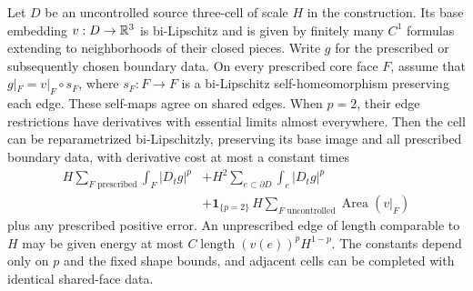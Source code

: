 \begin{lemma}\label{la:cell-completion}
Let $D$ be an uncontrolled source three-cell of scale $H$ in the
construction.  Its base embedding $v:D\to\mathbb R^3$ is bi-Lipschitz and is
given by finitely many $C^1$ formulas extending to neighborhoods of
their closed pieces.  Write $g$ for the prescribed or subsequently
chosen boundary data.  On every prescribed core face $F$,
assume that $g|_F=v|_F\circ s_F$, where $s_F:F\to F$ is a
bi-Lipschitz self-homeomorphism preserving each edge.  These self-maps
agree on shared edges.  When $p=2$, their edge restrictions have
derivatives with essential limits almost everywhere.
Then the cell can be reparametrized bi-Lipschitzly, preserving its
base image and all prescribed boundary data, with derivative cost
at most a constant times
\begin{equation}\label{la:cell-cost}
 \begin{split}
 H\sum_{F\text{ prescribed}}\int_F|D_tg|^p
 &+H^2\sum_{e\subset\partial D}\int_e|D_tg|^p\\
 &+\mathbf1_{\{p=2\}}\,
       H\sum_{F\text{ uncontrolled}}\operatorname{Area}(v|_F)
 \end{split}
\end{equation}
plus any prescribed positive error.  An unprescribed edge of length
comparable to $H$ may be given energy at most
$C\operatorname{length}(v(e))^pH^{1-p}$.
The constants depend only on $p$ and the fixed shape bounds, and
adjacent cells can be completed with identical shared-face data.
\end{lemma}

